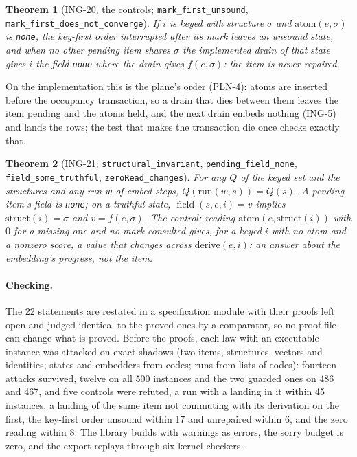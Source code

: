 \documentclass[11pt]{article}
\theoremstyle{plain}
\newtheorem{theorem}{Theorem}[section]
\theoremstyle{definition}
\theoremstyle{remark}
\newcommand{\lean}[1]{\texttt{#1}}
\newcommand{\ing}[1]{ING-#1}
\newcommand{\field}{\operatorname{field}}
\begin{document}
\begin{theorem}[\ing{20}, the controls; \lean{mark\_first\_unsound},
\lean{mark\_first\_does\_not\_converge}]
If $i$ is keyed with structure $\sigma$ and $\mathrm{atom}(e, \sigma)$ is \lean{none}, the
key-first order interrupted after its mark leaves an unsound state, and when no other pending item
shares $\sigma$ the implemented drain of that state gives $i$ the field \lean{none} where the drain
gives $f(e, \sigma)$: the item is never repaired.
\end{theorem}

On the implementation this is the plane's order (PLN-4): atoms are inserted before the occupancy
transaction, so a drain that dies between them leaves the item pending and the atoms held, and
the next drain embeds nothing (\ing{5}) and lands the rows; the test that makes the transaction
die once checks exactly that.

\begin{theorem}[\ing{21}; \lean{structural\_invariant}, \lean{pending\_field\_none},
\lean{field\_some\_truthful}, \lean{zeroRead\_changes}]
For any $Q$ of the keyed set and the structures and any run $w$ of embed steps,
$Q(\mathrm{run}(w, s)) = Q(s)$. A pending item's field is \lean{none}; on a truthful state,
$\field(s, e, i) = v$ implies $\mathrm{struct}(i) = \sigma$ and $v = f(e, \sigma)$. The control:
reading $\mathrm{atom}(e, \mathrm{struct}(i))$ with $0$ for a missing one and no mark consulted
gives, for a keyed $i$ with no atom and a nonzero score, a value that changes across
$\mathrm{derive}(e, i)$: an answer about the embedding's progress, not the item.
\end{theorem}

\paragraph{Checking.} The 22 statements are restated in a specification module with their proofs
left open and judged identical to the proved ones by a comparator, so no proof file can change
what is proved. Before the proofs, each law with an executable instance was attacked on exact
shadows (two items, structures, vectors and identities; states and embedders from codes; runs from
lists of codes): fourteen attacks survived, twelve on all 500 instances and the two guarded ones on
486 and 467, and five controls were refuted, a run with a landing in it within 45 instances, a
landing of the same item not commuting with its derivation on the first, the key-first order
unsound within 17 and unrepaired within 6, and the zero reading within 8. The library builds with
warnings as errors, the sorry budget is zero, and the export replays through six kernel checkers.
\end{document}
